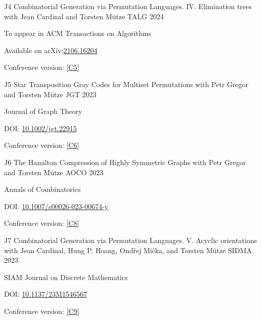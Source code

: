 \begin{cvpublication}
	{J4}
	{Combinatorial Generation via Permutation Languages. IV. Elimination trees}
	{with Jean Cardinal and Torsten Mütze}
	{TALG}
	{2024}
    {
	\begin{cvitems}
	\item To appear in ACM Transactions on Algorithms
	\item[] Available on arXiv:\href{https://arxiv.org/abs/2106.16204}{2106.16204}
	\item Conference version: \hyperlink{paperC5}{[C5]}
	\end{cvitems}
	}
\end{cvpublication}
\begin{cvpublication}
	{J5}
	{Star Transposition Gray Codes for Multiset Permutations}
	{with Petr Gregor and Torsten Mütze}
	{JGT}
	{2023}
    {
	\begin{cvitems}
	\item Journal of Graph Theory
	\item[] DOI: \href{https://doi.org/10.1002/jgt.22915}{10.1002/jgt.22915}
	\item Conference version: \hyperlink{paperC6}{[C6]}
	\end{cvitems}
	}
\end{cvpublication}
\begin{cvpublication}
	{J6}
	{The Hamilton Compression of Highly Symmetric Graphs}
	{with Petr Gregor and Torsten Mütze}
	{AOCO}
	{2023}
    {
	\begin{cvitems}
	\item Annals of Combinatorics
	\item[] DOI: \href{https://doi.org/10.1007/s00026-023-00674-y}{10.1007/s00026-023-00674-y}
	\item Conference version: \hyperlink{paperC8}{[C8]}
	\end{cvitems}
	}
\end{cvpublication}
\begin{cvpublication}
	{J7}
	{Combinatorial Generation via Permutation Languages. V. Acyclic orientations}
	{with Jean Cardinal, Hung P. Hoang, Ondřej Mička, and Torsten Mütze}
	{SIDMA}
	{2023}
    {
	\begin{cvitems}
	\item SIAM Journal on Discrete Mathematics
	\item[] DOI: \href{https://doi.org/10.1137/23M1546567}{10.1137/23M1546567}
	\item Conference version: \hyperlink{paperC9}{[C9]}
	\end{cvitems}
	}
\end{cvpublication}
